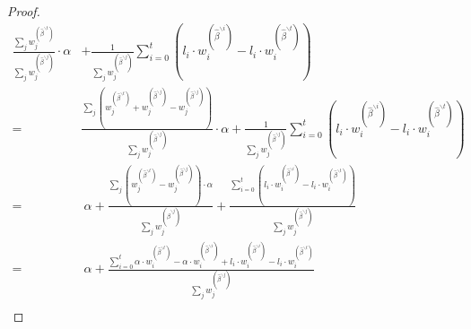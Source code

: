 \begin{proof}
\begin{align}\label{eq:cpc_pf_branch_point}
    \frac{\sum_{j}w_j^{(\hat\beta^{\backslash t})}}{\sum_{j}w_j^{(\hat\beta^{\backslash j})}}\cdot\alpha & +  \frac{1}{\sum_{j}w_j^{(\hat\beta^{\backslash j})}}\sum_{i=0}^{t}(l_i\cdot w_i^{(\hat\beta^{\backslash i})} - l_i\cdot w_i^{(\hat\beta^{\backslash t})}) \nonumber \\
    = & \frac{\sum_{j}(w_j^{(\hat\beta^{\backslash t})} + w_j^{(\hat\beta^{\backslash j})} - w_j^{(\hat\beta^{\backslash j})})}{\sum_{j}w_j^{(\hat\beta^{\backslash j})}}\cdot\alpha +  \frac{1}{\sum_{j}w_j^{(\hat\beta^{\backslash j})}}\sum_{i=0}^{t}(l_i\cdot w_i^{(\hat\beta^{\backslash i})} - l_i\cdot w_i^{(\hat\beta^{\backslash t})}) \nonumber \\
    = & \ \alpha + \frac{\sum_{j}(w_j^{(\hat\beta^{\backslash t})} - w_j^{(\hat\beta^{\backslash j})})\cdot\alpha}{\sum_{j}w_j^{(\hat\beta^{\backslash j})}} +  \frac{\sum_{i=0}^{t}(l_i\cdot w_i^{(\hat\beta^{\backslash i})} - l_i\cdot w_i^{(\hat\beta^{\backslash t})})}{\sum_{j}w_j^{(\hat\beta^{\backslash j})}} \nonumber \\
    = & \ \alpha + \frac{\sum_{i=0}^{t}\alpha\cdot w_i^{(\hat\beta^{\backslash t})} - \alpha\cdot w_i^{(\hat\beta^{\backslash i})} + l_i\cdot w_i^{(\hat\beta^{\backslash i})} - l_i\cdot w_i^{(\hat\beta^{\backslash t})}}{\sum_{j}w_j^{(\hat\beta^{\backslash j})}} \nonumber \\

\end{align}
\end{proof}
